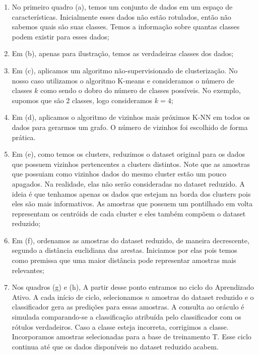 \begin{enumerate}
  \item No primeiro quadro (a), temos um conjunto de dados em um espaço de características. Inicialmente esses dados não estão rotulados, então não sabemos quais são suas classes. Temos a informação sobre quantas classes podem existir para esses dados;
  
  \item Em (b), apenas para ilustração, temos as verdadeiras classes dos dados;
  
  \item Em (c), aplicamos um algoritmo não-supervisionado de clusterização. No nosso caso utilizamos o algoritmo K-means e consideramos o número de classes $k$ como sendo o dobro do número de classes possíveis. No exemplo, supomos que são 2 classes, logo consideramos $k=4$; 
  
  \item Em (d), aplicamos o algoritmo de vizinhos mais próximos K-NN em todos os dados para gerarmos um grafo. O número de vizinhos foi escolhido de forma prática. 
  

  \item Em (e), como temos os clusters, reduzimos o dataset original para os dados que possuem vizinhos pertencentes a clusters distintos. Note que as amostras que possuiam como vizinhos dados do mesmo cluster estão um pouco apagados. Na realidade, elas não serão consideradas no dataset reduzido. A ideia é que tenhamos apenas os dados que estejam na borda dos clusters pois eles são mais informativos. As amostras que possuem um pontilhado em volta representam os centróids de cada cluster e eles também compõem o dataset reduzido;
  
  \item Em (f), ordenamos as amostras do dataset reduzido, de maneira decrescente, segundo a distância euclidiana das arestas. Iniciamos por elas pois temos como premissa que uma maior distância pode representar amostras mais relevantes;
  
  \item Nos quadros (g) e (h), %
  A partir desse ponto entramos no ciclo do Aprendizado Ativo. A cada início de ciclo, selecionamos $n$ amostras do dataset reduzido e o classificador gera as predições para essas amostras. A consulta ao oráculo é simulada comparando-se a classificação atribuída pelo classificador com os rótulos verdadeiros. Caso a classe esteja incorreta, corrigimos a classe. Incorporamos amostras selecionadas para a base de treinamento T. Esse ciclo continua até que os dados disponíveis no dataset reduzido acabem. 
\end{enumerate}

